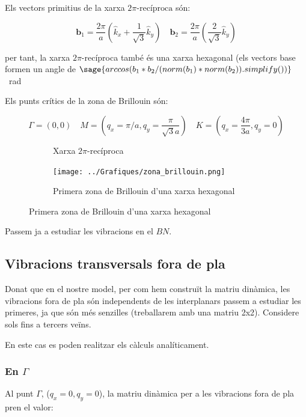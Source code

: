 \documentclass[12pt]{article} %
\let\vec\mathbf %
\begin{document}
Els vectors primitius de la xarxa $2\pi\text{-recíproca}$ són:

\begin{equation}
\label{eq:11}
\vec b_1=\frac{2\pi}{a}\left(\hat k_{x}+\frac{1}{\sqrt{3}}\hat k_{y}\right)\quad \vec b_2=\frac{2\pi}{a}\left(\frac{2}{\sqrt{3}}\hat k_y\right)
\end{equation} 

per tant, la xarxa $2\pi$-recíproca també és una xarxa hexagonal (els vectors base formen un angle de $\sage{arccos(b_1*b_2/(norm(b_1)*norm(b_2)).simplify())}$ \SI{}{\radian}

Els punts crítics de la zona de Brillouin són:

\begin{equation}
 \label{puntsbrillouin}
 \Gamma=(0,0)\quad M=\left(q_x=\pi/a,q_y=\frac{\pi}{\sqrt{3} a}\right)\quad K=\left(q_x=\frac{4\pi}{3 a}, q_y=0\right)
\end{equation}

\newpage

\begin{figure}[h]
\centering
\begin{subfigure}[b]{0.4\textwidth}
\centering
{}
\caption{Xarxa $2\pi$-recíproca}
\end{subfigure}
\begin{subfigure}[b]{0.4\textwidth}
\centering
\texttt{[image: ../Grafiques/zona\_brillouin.png]}
\caption{Primera zona de Brillouin d'una xarxa hexagonal}
\end{subfigure}
\end{figure}



Passem ja a estudiar les vibracions en el $BN$.
\subsection{Vibracions transversals fora de pla}
Donat que en el nostre model, per com hem construït la matriu dinàmica, les vibracions fora de pla són independents de les interplanars passem a estudiar les primeres, ja que són més senzilles (treballarem amb una matriu 2x2). Considere sols fins a tercers veïns.

En este cas es poden realitzar els càlculs analíticament.

\subsubsection{En $\Gamma$}
Al punt $\Gamma$, ($q_x=0, q_y=0$), la matriu dinàmica  per a les vibracions fora de pla pren el valor:
\end{document}
